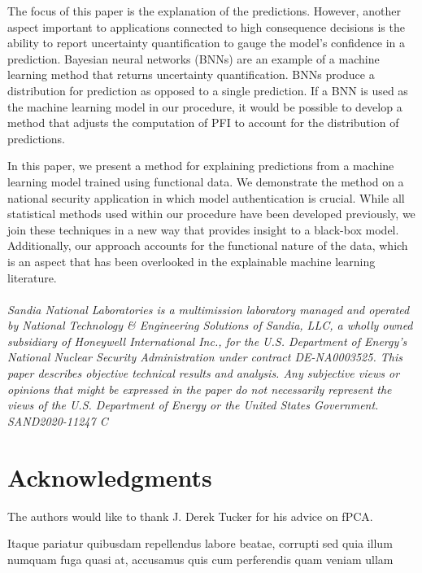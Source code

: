 \documentclass[letterpaper]{article}
\begin{document}
The focus of this paper is the explanation of the predictions. However, another aspect important to applications connected to high consequence decisions is the ability to report uncertainty quantification to gauge the model's confidence in a prediction. Bayesian neural networks (BNNs) are an example of a machine learning method that returns uncertainty quantification. BNNs produce a distribution for prediction as opposed to a single prediction. If a BNN is used as the machine learning model in our procedure, it would be possible to develop a method that adjusts the computation of PFI to account for the distribution of predictions.

In this paper, we present a method for explaining predictions from a machine learning model trained using functional data. We demonstrate the method on a national security application in which model authentication is crucial. While all statistical methods used within our procedure have been developed previously, we join these techniques in a new way that provides insight to a black-box model. Additionally, our approach accounts for the functional nature of the data, which is an aspect that has been overlooked in the explainable machine learning literature.\\
\\
\textit{Sandia National Laboratories is a multimission laboratory managed and operated by National Technology \& Engineering Solutions of Sandia, LLC, a wholly owned subsidiary of Honeywell International Inc., for the U.S. Department of Energy's National Nuclear Security Administration under contract DE-NA0003525. This paper describes objective technical results and analysis. Any subjective views or opinions that might be expressed in the paper do not necessarily represent the views of the U.S. Department of Energy or the United States Government. SAND2020-11247 C}

\section*{Acknowledgments}

The authors would like to thank J. Derek Tucker for his advice on fPCA.


Itaque pariatur quibusdam repellendus labore beatae, corrupti sed quia illum numquam fuga quasi at, accusamus quis cum perferendis quam veniam ullam

\end{document}
